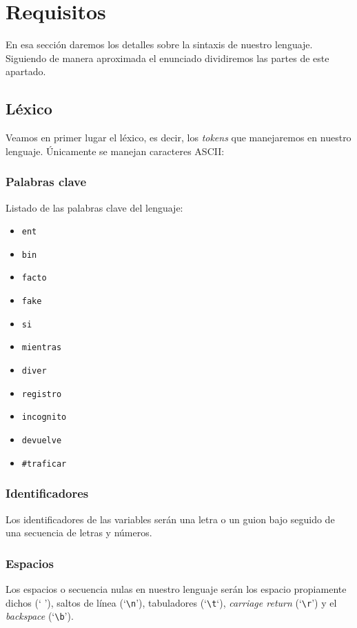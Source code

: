 \section{Requisitos}
En esa sección daremos los detalles sobre la sintaxis de nuestro lenguaje.
Siguiendo de manera aproximada el enunciado dividiremos las partes de este
apartado.

\subsection{Léxico}
Veamos en primer lugar el léxico, es decir, los \textit{tokens} que manejaremos
en nuestro lenguaje. Únicamente se manejan caracteres ASCII:
\subsubsection{Palabras clave}
Listado de las palabras clave del lenguaje:
\begin{itemize}
    \item \lstinline{ent}
    \item \lstinline{bin}
    \item \lstinline{facto}
    \item \lstinline{fake}
    \item \lstinline{si}
    \item \lstinline{mientras}
    \item \lstinline{diver}
    \item \lstinline{registro}
    \item \lstinline{incognito}
    \item \lstinline{devuelve}
    \item \lstinline{#traficar}
\end{itemize}

\subsubsection{Identificadores}
Los identificadores de las variables serán una letra o un guion bajo seguido de
una secuencia de letras y números.

\subsubsection{Espacios}
Los espacios o secuencia nulas en nuestro lenguaje serán los espacio propiamente
dichos (` '), saltos de línea (`\lstinline{\n}'), tabuladores
(`\lstinline{\t}`), \textit{carriage return} (`\lstinline{\r}') y el
\textit{backspace} (`\lstinline{\b}').

